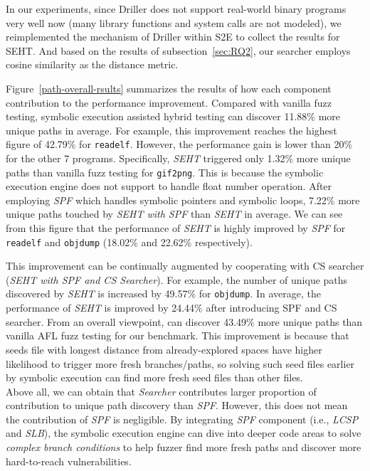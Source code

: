 In our experiments, since Driller \cite{stephens2016driller} does not support 
real-world binary programs very well now (many library functions and system 
calls are not modeled), we reimplemented the mechanism of Driller within 
S2E to collect the results for SEHT. And based on the results of 
subsection~\ref{sec:RQ2}, our searcher employs cosine similarity 
as the distance metric.

Figure~\ref{path-overall-rsults} summarizes the results of how each 
component contribution to the performance improvement. Compared with 
vanilla fuzz testing, symbolic execution assisted hybrid testing can 
discover 11.88\% more unique paths in average. For example, this 
improvement reaches the highest figure of 42.79\% for \texttt{readelf}. 
However, the performance gain is lower than 20\% for the other 7 programs. 
Specifically, \textit{SEHT} triggered only 1.32\% more unique paths 
than vanilla fuzz testing for \texttt{gif2png}. This is because the 
symbolic execution engine does not support to handle float number 
operation. After employing \textit{SPF} which handles symbolic pointers 
and symbolic loops, 7.22\% more unique paths touched by \textit{SEHT with SPF} 
than \textit{SEHT} in average. We can see from this figure that 
the performance of \textit{SEHT} is highly improved by \textit{SPF} 
for \texttt{readelf} and \texttt{objdump} (18.02\% and 22.62\% respectively).
 
This improvement can be continually augmented by cooperating with CS 
searcher (\textit{SEHT with SPF and CS Searcher}). For example, the number 
of unique paths discovered by \textit{SEHT} is increased by 
49.57\% for \texttt{objdump}. In average, the performance of \textit{SEHT} 
is improved by 24.44\% after introducing SPF and CS searcher. From an 
overall viewpoint, \prototype can discover 43.49\% more unique paths 
than vanilla AFL fuzz testing for our benchmark. This improvement is 
because that seeds file with longest distance from already-explored 
spaces have higher likelihood to trigger more fresh branches/paths, 
so solving such seed files earlier by symbolic execution can find more 
fresh seed files than other files. \\

 
Above all, we can obtain that \textit{Searcher} contributes larger 
proportion of contribution to unique path discovery than \textit{SPF}. 
However, this does not mean the contribution of \textit{SPF} is 
negligible. By integrating \textit{SPF} component (i.e., \textit{LCSP} 
and \textit{SLB}), the symbolic execution engine can dive into deeper 
code areas to solve \textit{complex branch conditions} to help fuzzer 
find more fresh paths and discover more hard-to-reach vulnerabilities.

